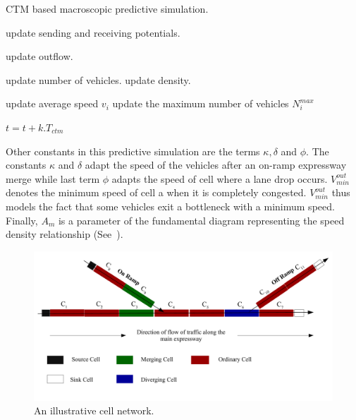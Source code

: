 \documentclass[12pt]{article}
\begin{document}
\begin{algorithm}[!htbp]
\caption{CTM based macroscopic predictive simulation.}
\label{algo:ctm}

\begin{algorithmic}[1]

\State update sending and receiving potentials.
\EndFor

\State update outflow.
\EndFor

\State update number of vehicles.
\State update density.
\EndFor

\State update average speed $v_{i}$
\State update the maximum number of vehicles $N^{max}_{i}$
\EndFor

\State $t=t+k.T_{ctm}$
\EndWhile


\end{algorithmic}
\end{algorithm}
Other constants in this predictive simulation are the terms $\kappa, \delta$ and $\phi$. The constants $\kappa$ and $\delta$ adapt the speed of the vehicles after an on-ramp expressway merge while last term $\phi$ adapts the speed of cell where a lane drop occurs. $V^{out}_{min}$ denotes the minimum speed of cell a when it is completely congested. $V^{out}_{min}$ thus models the fact that some vehicles exit a bottleneck with a minimum speed. Finally, $A_{m}$ is a parameter of the fundamental diagram representing the speed density relationship (See~\cite{kotsialos2002traffic}).


\begin{figure}[!htbp]
    \centering
    \includegraphics[scale=0.5]{images/cellNetwork.pdf}

    \caption{An illustrative cell network.}
    \label{fig:cell-network}
\end{figure}
  
\end{document}
